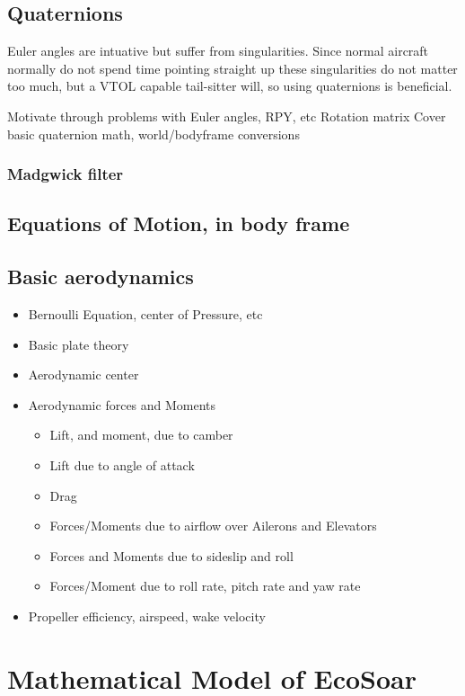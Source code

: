 \documentclass{article}
\begin{document}
\subsection{Quaternions}
Euler angles are intuative but suffer from singularities.
Since normal aircraft normally do not spend time pointing straight up these singularities do not matter too much, but a VTOL capable tail-sitter will, so using quaternions is beneficial.


Motivate through problems with Euler angles, RPY, etc
Rotation matrix
Cover basic quaternion math,
world/bodyframe conversions
\subsubsection{Madgwick filter}
\subsection{Equations of Motion, in body frame}


\subsection {Basic aerodynamics}

\begin{itemize}
        \item Bernoulli Equation, center of Pressure, etc
        \item Basic plate theory
        \item Aerodynamic center    
        \item Aerodynamic forces and Moments
        \begin{itemize}
            \item Lift, and moment, due to camber
            \item Lift due to angle of attack
            \item Drag
            \item Forces/Moments due to airflow over Ailerons and Elevators
            \item Forces and Moments due to sideslip and roll
            \item Forces/Moment due to roll rate, pitch rate and yaw rate
        \end{itemize}
        \item Propeller efficiency, airspeed, wake velocity
    \end{itemize}

\section{Mathematical Model of EcoSoar}
\end{document}
